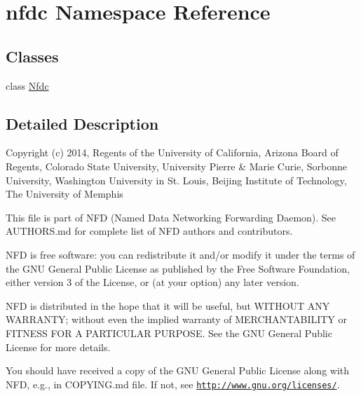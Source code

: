 \hypertarget{namespacenfdc}{}\section{nfdc Namespace Reference}
\label{namespacenfdc}
\subsection*{Classes}
\begin{DoxyCompactItemize}
\item 
class \hyperlink{classnfdc_1_1Nfdc}{Nfdc}
\end{DoxyCompactItemize}


\subsection{Detailed Description}
Copyright (c) 2014, Regents of the University of California, Arizona Board of Regents, Colorado State University, University Pierre \& Marie Curie, Sorbonne University, Washington University in St. Louis, Beijing Institute of Technology, The University of Memphis

This file is part of N\+FD (Named Data Networking Forwarding Daemon). See A\+U\+T\+H\+O\+R\+S.\+md for complete list of N\+FD authors and contributors.

N\+FD is free software\+: you can redistribute it and/or modify it under the terms of the G\+NU General Public License as published by the Free Software Foundation, either version 3 of the License, or (at your option) any later version.

N\+FD is distributed in the hope that it will be useful, but W\+I\+T\+H\+O\+UT A\+NY W\+A\+R\+R\+A\+N\+TY; without even the implied warranty of M\+E\+R\+C\+H\+A\+N\+T\+A\+B\+I\+L\+I\+TY or F\+I\+T\+N\+E\+SS F\+OR A P\+A\+R\+T\+I\+C\+U\+L\+AR P\+U\+R\+P\+O\+SE. See the G\+NU General Public License for more details.

You should have received a copy of the G\+NU General Public License along with N\+FD, e.\+g., in C\+O\+P\+Y\+I\+N\+G.\+md file. If not, see \href{http://www.gnu.org/licenses/}{\tt http\+://www.\+gnu.\+org/licenses/}. 